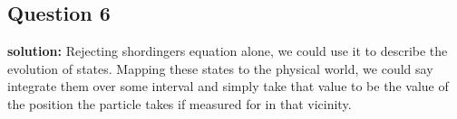 \documentclass{article}
\begin{document}
\subsection*{Question 6}
\noindent\textbf{solution:} Rejecting shordingers equation alone, we could use it to describe the evolution of states. Mapping these states to the physical world, we could say integrate them over some interval and simply take that value to be the value of the position the particle takes if measured for in that vicinity.
\end{document}

